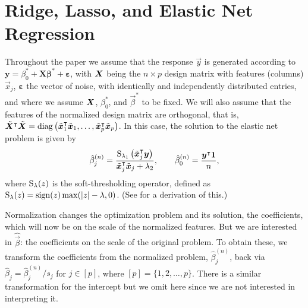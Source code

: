 \section{Ridge, Lasso, and Elastic Net Regression}%
\label{sec:theory}

Throughout the paper we assume that the response \(\vec{y}\) is generated according to
\(\bm{y} = \beta_0^* + \bm{X\beta}^* + \bm{\varepsilon}\), with \(\bm X\) being the \(n
\times p\) design matrix with features (columns) \(\vec x_j\), \(\bm{\varepsilon}\) the
vector of noise, with identically and independently distributed entries, and where we
assume \(\bm{X}\), \(\beta_0^*\), and \(\vec{\beta}^*\) to be fixed. We will also assume
that the features of the normalized design matrix are orthogonal, that is,
\(\tilde{\bm{X}}^\intercal \tilde{\bm{X}} = \operatorname{diag}\left(\tilde{\bm{x}}_1^\intercal
\tilde{\bm{x}}_1, \dots, \tilde{\bm{x}}_p^\intercal \tilde{\bm{x}}_p\right)\). In this
case, the solution to the elastic net problem is given by
%
\begin{equation}
  \label{eq:orthogonal-solution-normalized}
  \hat{\beta}^{(n)}_j = \frac{\operatorname{S}_{\lambda_1}\left(\tilde{\bm{x}}_j^\intercal \bm{y}\right)}{\tilde{\bm{x}}_j^\intercal \tilde{\bm{x}}_j + \lambda_2},
  \qquad
  \hat{\beta}_0^{(n)} = \frac{\bm{y}^\intercal \bm{1}}{n},
\end{equation}
%
where \(\operatorname{S}_\lambda(z)\) is the soft-thresholding operator, defined as \(\operatorname{S}_\lambda(z) =
\operatorname{sign}(z) \max(|z| - \lambda, 0)\). (See  for a derivation
of this.)

Normalization changes the optimization problem and its solution, the coefficients, which
will now be on the scale of the normalized features. But we are interested in
\(\hat{\vec{\beta}}\): the coefficients on the scale of the original problem. To obtain
these, we transform the coefficients from the normalized problem, \(\hat\beta^{(n)}_j\),
back via \(\hat\beta_j = \hat\beta^{(n)}_j/s_j\) for \(j \in [p]\), where \([p] =
\{1,2,\dots,p\}\). There is a similar transformation for the intercept but we omit here
since we are not interested in interpreting it.

